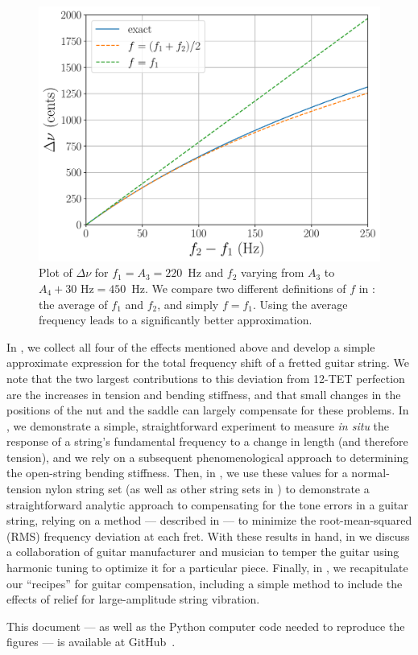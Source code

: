 \begin{figure}
    \centering
    \includegraphics[width=6.5in]{figures/diff_pitch}
    \caption{\label{fig:diff_pitch} Plot of $\Delta \nu$ for $f_1 = A_3 = 220$~Hz and $f_2$ varying from $A_3$ to $A_4 + 30 \textrm{ Hz} = 450$~Hz. We compare two different definitions of $f$ in : the average of $f_1$ and $f_2$, and simply $f = f_1$. Using the average frequency leads to a significantly better approximation.}
\end{figure}

In , we collect all four of the effects mentioned above and develop a simple approximate expression for the total frequency shift of a fretted guitar string. We note that the two largest contributions to this deviation from 12-TET perfection are the increases in tension and bending stiffness, and that small changes in the positions of the nut and the saddle can largely compensate for these problems. In , we demonstrate a simple, straightforward experiment to measure \emph{in situ} the response of a string's fundamental frequency to a change in length (and therefore tension), and we rely on a subsequent phenomenological approach to determining the open-string bending stiffness. Then, in , we use these values for a normal-tension nylon string set (as well as other string sets in ) to demonstrate a straightforward analytic approach to compensating for the tone errors in a guitar string, relying on a method --- described in  --- to minimize the root-mean-squared (RMS) frequency deviation at each fret. With these results in hand, in  we discuss a collaboration of guitar manufacturer and musician to temper the guitar using harmonic tuning to optimize it for a particular piece. Finally, in , we recapitulate our ``recipes'' for guitar compensation, including a simple method to include the effects of relief for large-amplitude string vibration.

This document --- as well as the Python computer code needed to reproduce the figures --- is available at GitHub~\cite{ref:github2024rgb}. 